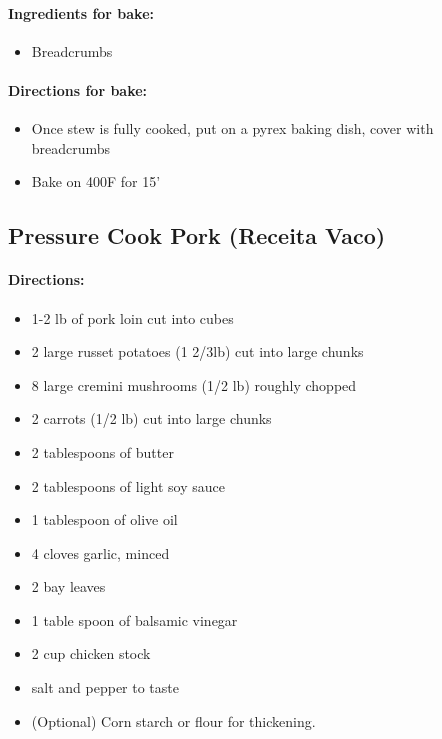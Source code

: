 \documentclass{article}
\begin{document}
\paragraph{Ingredients for bake:}
\begin{itemize}
	\item Breadcrumbs
\end{itemize}

\paragraph{Directions for bake:}
\begin{itemize}
	\item Once stew is fully cooked, put on a pyrex baking dish, cover with breadcrumbs
	\item Bake on 400F for 15'
\end{itemize}

\subsection{Pressure Cook Pork (Receita Vaco)}

\paragraph{Directions:}
\begin{itemize}
	\item	1-2 lb of pork loin cut into cubes
	\item 2 large russet potatoes (1 2/3lb) cut into large chunks
	\item 8 large cremini mushrooms (1/2 lb) roughly chopped
	\item 2 carrots (1/2 lb) cut into large chunks
	\item 2 tablespoons of butter
	\item 2 tablespoons of light soy sauce
	\item 1 tablespoon of olive oil
	\item 4 cloves garlic, minced
	\item 2 bay leaves
	\item 1 table spoon of balsamic vinegar
	\item 2 cup chicken stock
	\item salt and pepper to taste
	\item (Optional) Corn starch or flour for thickening.
\end{itemize}
\end{document}

